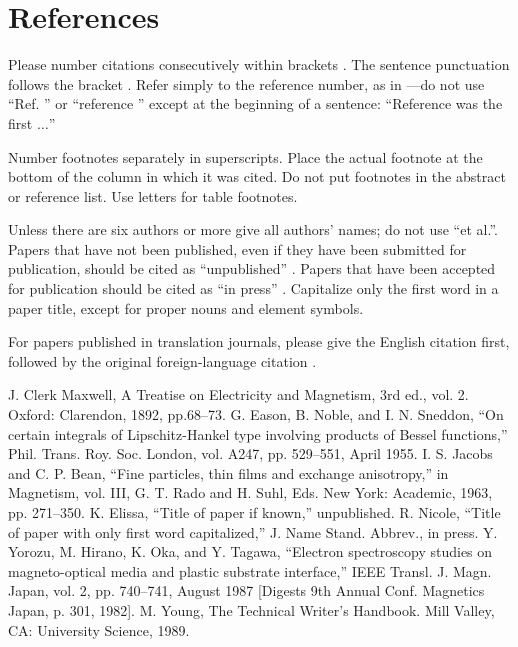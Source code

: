 \documentclass[conference]{IEEEtran}
\begin{document}
\section*{References}

Please number citations consecutively within brackets \cite{b1}. The 
sentence punctuation follows the bracket \cite{b2}. Refer simply to the reference 
number, as in \cite{b3}---do not use ``Ref. \cite{b3}'' or ``reference \cite{b3}'' except at 
the beginning of a sentence: ``Reference \cite{b3} was the first $\ldots$''

Number footnotes separately in superscripts. Place the actual footnote at 
the bottom of the column in which it was cited. Do not put footnotes in the 
abstract or reference list. Use letters for table footnotes.

Unless there are six authors or more give all authors' names; do not use 
``et al.''. Papers that have not been published, even if they have been 
submitted for publication, should be cited as ``unpublished'' \cite{b4}. Papers 
that have been accepted for publication should be cited as ``in press'' \cite{b5}. 
Capitalize only the first word in a paper title, except for proper nouns and 
element symbols.

For papers published in translation journals, please give the English 
citation first, followed by the original foreign-language citation \cite{b6}.

\begin{thebibliography}{00}
 J. Clerk Maxwell, A Treatise on Electricity and Magnetism, 3rd ed., vol. 2. Oxford: Clarendon, 1892, pp.68--73.
 G. Eason, B. Noble, and I. N. Sneddon, ``On certain integrals of Lipschitz-Hankel type involving products of Bessel functions,'' Phil. Trans. Roy. Soc. London, vol. A247, pp. 529--551, April 1955.
 I. S. Jacobs and C. P. Bean, ``Fine particles, thin films and exchange anisotropy,'' in Magnetism, vol. III, G. T. Rado and H. Suhl, Eds. New York: Academic, 1963, pp. 271--350.
 K. Elissa, ``Title of paper if known,'' unpublished.
 R. Nicole, ``Title of paper with only first word capitalized,'' J. Name Stand. Abbrev., in press.
 Y. Yorozu, M. Hirano, K. Oka, and Y. Tagawa, ``Electron spectroscopy studies on magneto-optical media and plastic substrate interface,'' IEEE Transl. J. Magn. Japan, vol. 2, pp. 740--741, August 1987 [Digests 9th Annual Conf. Magnetics Japan, p. 301, 1982].
 M. Young, The Technical Writer's Handbook. Mill Valley, CA: University Science, 1989.
\end{thebibliography}
\end{document}
